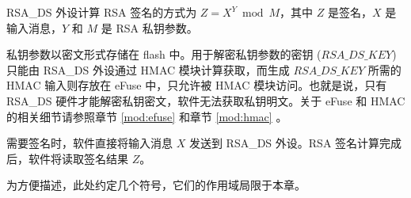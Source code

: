 \documentclass[main\_\_CN.tex]{subfiles}
\begin{document}
RSA\_DS 外设计算 RSA 签名的方式为 \begin{math}Z = X^{Y} \bmod M\end{math}，其中 \begin{math}Z\end{math} 是签名，\begin{math}X\end{math} 是输入消息，\begin{math}Y\end{math} 和 \begin{math}M\end{math} 是 RSA 私钥参数。

私钥参数以密文形式存储在 flash 中。用于解密私钥参数的密钥 (\begin{math} RSA\_DS\_KEY \end{math}) 只能由 RSA\_DS 外设通过 HMAC 模块计算获取，而生成 \begin{math} RSA\_DS\_KEY \end{math} 所需的 HMAC 输入则存放在 eFuse 中，只允许被 HMAC 模块访问。也就是说，只有 RSA\_DS 硬件才能解密私钥密文，软件无法获取私钥明文。关于 eFuse 和 HMAC 的相关细节请参照章节 \ref{mod:efuse} \textit{} 和章节 \ref{mod:hmac} \textit{}。

需要签名时，软件直接将输入消息 \begin{math}X\end{math} 发送到 RSA\_DS 外设。RSA 签名计算完成后，软件将读取签名结果 \begin{math}Z\end{math}。


为方便描述，此处约定几个符号，它们的作用域局限于本章。
\end{document}
